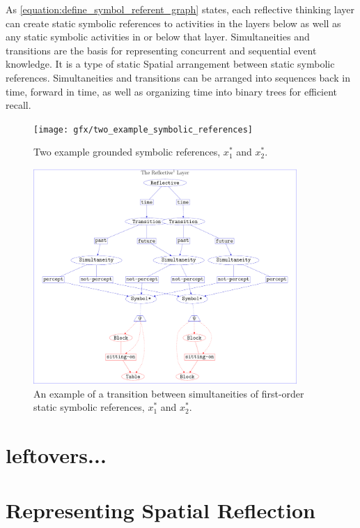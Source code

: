 As {\mbox{\autoref{equation:define_symbol_referent_graph}}} states,
each reflective thinking layer can create static symbolic references
to activities in the layers below as well as any static symbolic
activities in or below that layer.  Simultaneities and transitions are
the basis for representing concurrent and sequential event knowledge.
It is a type of static Spatial arrangement between static symbolic
references.  Simultaneities and transitions can be arranged into
sequences back in time, forward in time, as well as organizing time
into binary trees for efficient recall.
\begin{figure}
\center
\texttt{[image: gfx/two\_example\_symbolic\_references]}
\caption[Two example symbolic references.]{Two example grounded symbolic references, $x_1^*$ and $x_2^*$.}
\label{figure:two_example_symbolic_references}
\end{figure}
\begin{figure}
\center
\includegraphics[width=10cm]{gfx/example_transition}
\caption[An example of a transition between simultaneities.]{An
  example of a transition between simultaneities of first-order static
  symbolic references, $x_1^*$ and $x_2^*$.}
\label{figure:example_transition}
\end{figure}










\section{leftovers...}

\section{Representing Spatial Reflection}

